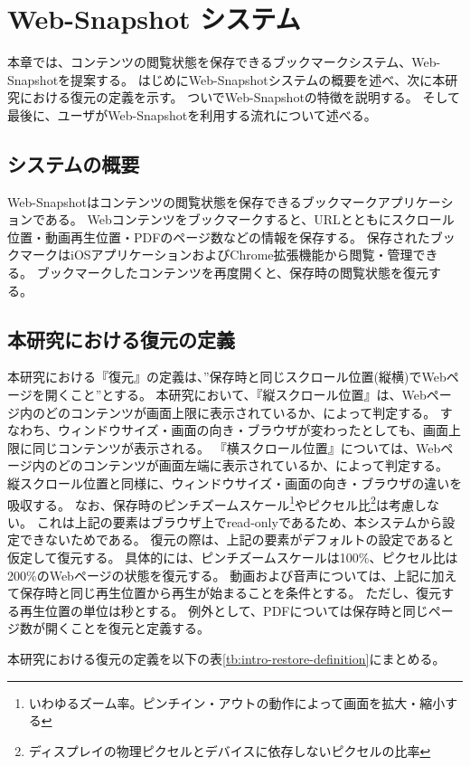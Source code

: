 \chapter{Web-Snapshot システム}
\label{chap:web_snapshot_system}
本章では、コンテンツの閲覧状態を保存できるブックマークシステム、Web-Snapshotを提案する。
はじめにWeb-Snapshotシステムの概要を述べ、次に本研究における復元の定義を示す。
ついでWeb-Snapshotの特徴を説明する。
そして最後に、ユーザがWeb-Snapshotを利用する流れについて述べる。

\section{システムの概要}
Web-Snapshotはコンテンツの閲覧状態を保存できるブックマークアプリケーションである。
Webコンテンツをブックマークすると、URLとともにスクロール位置・動画再生位置・PDFのページ数などの情報を保存する。
保存されたブックマークはiOSアプリケーションおよびChrome拡張機能から閲覧・管理できる。
ブックマークしたコンテンツを再度開くと、保存時の閲覧状態を復元する。

\section{本研究における復元の定義}
\label{chap:web-snapshot-system-restore-definition}
本研究における『復元』の定義は、”保存時と同じスクロール位置(縦横)でWebページを開くこと”とする。
本研究において、『縦スクロール位置』は、Webページ内のどのコンテンツが画面上限に表示されているか、によって判定する。
すなわち、ウィンドウサイズ・画面の向き・ブラウザが変わったとしても、画面上限に同じコンテンツが表示される。
『横スクロール位置』については、Webページ内のどのコンテンツが画面左端に表示されているか、によって判定する。
縦スクロール位置と同様に、ウィンドウサイズ・画面の向き・ブラウザの違いを吸収する。
なお、保存時のピンチズームスケール\footnote{いわゆるズーム率。ピンチイン・アウトの動作によって画面を拡大・縮小する}やピクセル比\footnote{ディスプレイの物理ピクセルとデバイスに依存しないピクセルの比率}は考慮しない。
これは上記の要素はブラウザ上でread-only\cite{}であるため、本システムから設定できないためである。
復元の際は、上記の要素がデフォルトの設定であると仮定して復元する。
具体的には、ピンチズームスケールは100\%、ピクセル比は200\%のWebページの状態を復元する。
動画および音声については、上記に加えて保存時と同じ再生位置から再生が始まることを条件とする。
ただし、復元する再生位置の単位は秒とする。
例外として、PDFについては保存時と同じページ数が開くことを復元と定義する。

本研究における復元の定義を以下の表\ref{tb:intro-restore-definition}にまとめる。

